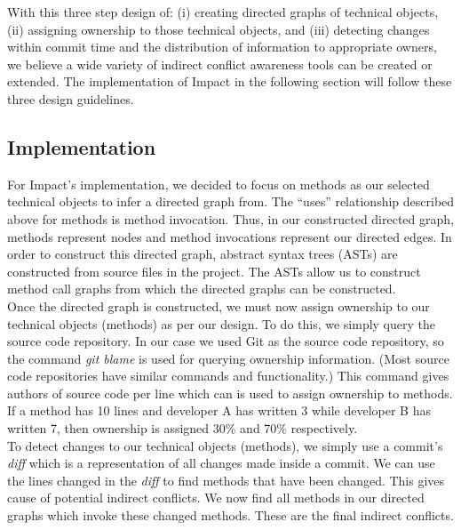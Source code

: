 \documentclass[conference]{IEEEtran}
\begin{document}
With this three step design of: (i) creating directed graphs of technical
objects, (ii) assigning ownership to those technical objects, and (iii)
detecting changes within commit time and the distribution of information
to appropriate owners, we believe a wide variety of
indirect conflict awareness tools can be created or extended. The
implementation of Impact in the following section will follow these
three design guidelines.

\subsection{Implementation}
For Impact's implementation, we decided to focus on methods as our
selected technical objects to infer a directed graph from. The ``uses'' 
relationship described above for methods is method invocation.
Thus, in our constructed directed graph, methods represent nodes
and method invocations represent our directed edges. In order to 
construct this directed graph, abstract syntax trees (ASTs) are 
constructed from source files in the project. The ASTs allow us
to construct method call graphs from which the directed 
graphs can be constructed.\\

Once the directed graph is constructed, we must now assign
ownership to our technical objects (methods) as per our design.
To do this, we simply query the source code repository. In our case
we used Git as the source code repository, so the command \textit{git blame}
is used for querying ownership information. (Most source code 
repositories have similar commands and functionality.) This command 
gives authors of source code per line which can is used to assign
ownership to methods. If a method has 10 lines and developer A
has written 3 while developer B has written 7, then ownership is
assigned 30\% and 70\% respectively.\\

To detect changes to our technical objects (methods), we simply 
use a commit's \textit{diff} which is a representation of all changes
made inside a commit. We can use the lines changed in the \textit{diff} to 
find methods that have been changed. This gives cause of potential
indirect conflicts. We now find all methods in our directed graphs
which invoke these changed methods. These are the final indirect
conflicts.\\
\end{document}
